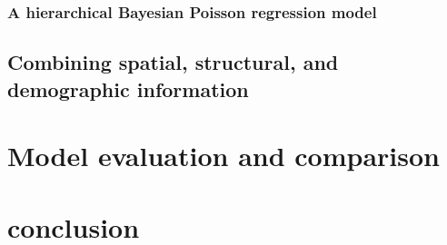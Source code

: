 \documentclass{svjour3}
\begin{document}
  
  
  
  
  
  
  \subsubsection{A hierarchical Bayesian Poisson regression model}
  
  
  \subsection{Combining spatial, structural, and demographic information}
  
  \section{Model evaluation and comparison}
  
  \section{conclusion}
  
















\clearpage


\end{document}
